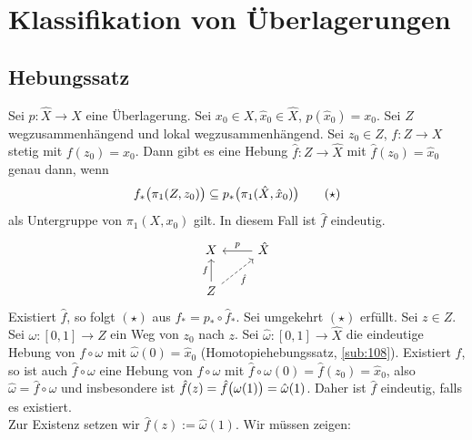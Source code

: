 \section{Klassifikation von Überlagerungen} %
\label{sec:13}

\subsection{Hebungssatz} %
\label{sub:131}
Sei $p: \hat{X} \to X$ eine Überlagerung. Sei $x_0 \in X, \hat{x}_0 \in \hat{X}$, $p(\hat{x}_0)= x_0$. Sei $Z$ wegzusammenhängend und lokal wegzusammenhängend. Sei 
$z_0 \in Z$, $f : Z \to X$ stetig mit $f(z_0)= x_0$. Dann gibt es eine Hebung $\hat{f} : Z \to \hat{X}$ mit $\hat{f} (z_0) = \hat{x}_0$ genau dann, wenn 
\[
	f_*\enbrace[\big]{\pi_1 (Z, z_0)} \subseteq  p_* \enbrace[\big]{\pi_1(\hat{X}, \hat{x}_0)} \tag*{$(\star)$}
\]
als Untergruppe von $\pi_1(X,x_0)$ gilt. In diesem Fall ist $\hat{f}$ eindeutig.
\[
	\begin{tikzcd}
		X & \hat{X} \lar[swap]{p} \\
		Z \uar{f}  \urar[dashed, swap]{\hat{f}}&
	\end{tikzcd}
\]
Existiert $\hat{f}$, so folgt $(\star)$ aus $f_* = p_* \circ\hat{f}_*$. Sei umgekehrt $(\star)$ erfüllt. Sei $z\in Z$. Sei $\omega : [0,1]\to Z$ ein Weg von $z_0$ nach $z$.
Sei $\hat{\omega} : [0,1] \to \hat{X}$ die eindeutige Hebung von $f \circ \omega$ mit $\hat{\omega}(0)= \hat{x}_0$ (Homotopiehebungssatz, \ref{sub:108}). Existiert 
$\hat{f}$, so ist auch $\hat{f} \circ \omega$ eine Hebung von $f \circ \omega$ mit $\hat{f} \circ \omega (0) = \hat{f}(z_0)= \hat{x}_0$, also 
$\hat{\omega} = \hat{f} \circ \omega$ und insbesondere ist $\hat{f}(z)= \hat{f} \enbrace[\big]{\omega(1)} = \hat{\omega}(1)$. Daher ist $\hat{f}$ eindeutig, falls es 
existiert. \smallskip \\
Zur Existenz setzen wir $\hat{f}(z) := \hat{\omega}(1)$. Wir müssen zeigen:
